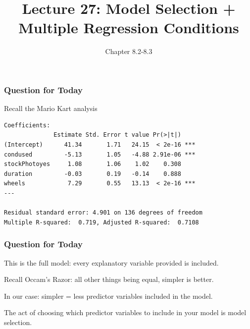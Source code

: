 \documentclass[handout]{beamer}
\title{Lecture 27: Model Selection + Multiple Regression Conditions}
\author{Chapter 8.2-8.3}
\date{}
\newcommand{\blue}[1]{\textcolor{blue2}{#1}}
\begin{document}
\begin{frame}
\titlepage
\end{frame}


\begin{frame}[fragile]
\frametitle{Question for Today}
Recall the Mario Kart analysis

\begin{small}
\begin{verbatim}
Coefficients:
              Estimate Std. Error t value Pr(>|t|)    
(Intercept)      41.34       1.71   24.15  < 2e-16 ***
condused         -5.13       1.05   -4.88 2.91e-06 ***
stockPhotoyes     1.08       1.06    1.02    0.308    
duration         -0.03       0.19   -0.14    0.888    
wheels            7.29       0.55   13.13  < 2e-16 ***
---

Residual standard error: 4.901 on 136 degrees of freedom
Multiple R-squared:  0.719,	Adjusted R-squared:  0.7108 
\end{verbatim}
\end{small}

\end{frame}


\begin{frame}[fragile]
\frametitle{Question for Today}
This is the \blue{full model}:  every explanatory variable provided is included.

\pause\vspace{0.5cm}

Recall Occam's Razor: \blue{all other things being equal, simpler is better}.  

\pause\vspace{0.5cm}

In our case:  simpler = less predictor variables included in the model.

\pause\vspace{0.5cm}

The act of choosing which predictor variables to include in your model is \blue{model selection}.

\end{frame}
\end{document}
